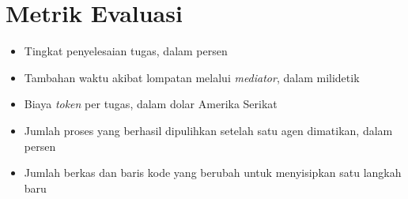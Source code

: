 \documentclass[11pt,a4paper]{article}
\begin{document}
\section{Metrik Evaluasi}

\begin{itemize}[leftmargin=*]
  \item Tingkat penyelesaian tugas, dalam persen
  \item Tambahan waktu akibat lompatan melalui \textit{mediator}, dalam milidetik
  \item Biaya \textit{token} per tugas, dalam dolar Amerika Serikat
  \item Jumlah proses yang berhasil dipulihkan setelah satu agen dimatikan, dalam persen
  \item Jumlah berkas dan baris kode yang berubah untuk menyisipkan satu langkah baru
\end{itemize}



\end{document}
